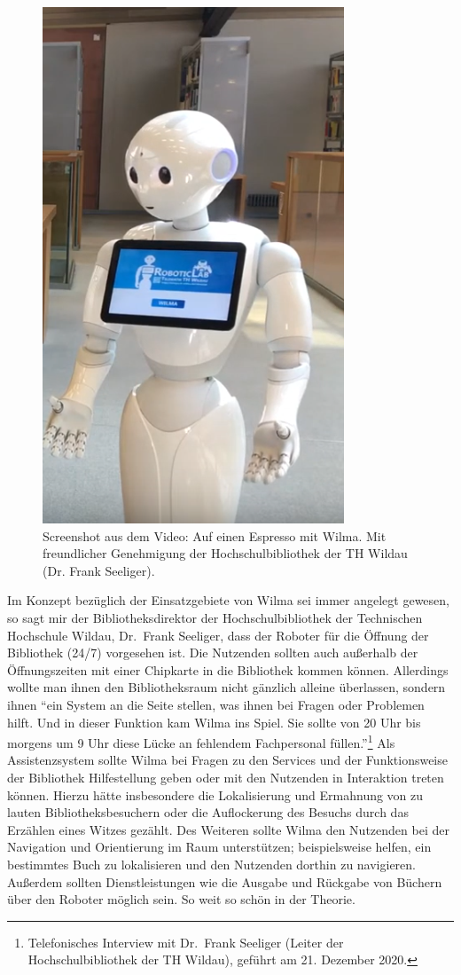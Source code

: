 \documentclass[a4paper,
fontsize=11pt,
oneside,
numbers=noperiodatend,
parskip=half-,
bibliography=totoc,
final
]{scrartcl}
\begin{document}
\begin{figure}
\centering
\includegraphics{img/Wilma.PNG}
\caption{Screenshot aus dem Video: Auf einen Espresso mit Wilma. Mit freundlicher Genehmigung der Hochschulbibliothek der TH Wildau (Dr. Frank Seeliger).}
\end{figure}

Im Konzept bezüglich der Einsatzgebiete von Wilma sei immer angelegt
gewesen, so sagt mir der Bibliotheksdirektor der Hochschulbibliothek der
Technischen Hochschule Wildau, Dr.~Frank Seeliger, dass der Roboter für
die Öffnung der Bibliothek (24/7) vorgesehen ist. Die Nutzenden sollten
auch außerhalb der Öffnungszeiten mit einer Chipkarte in die Bibliothek
kommen können. Allerdings wollte man ihnen den Bibliotheksraum nicht
gänzlich alleine überlassen, sondern ihnen \enquote{ein System an die
Seite stellen, was ihnen bei Fragen oder Problemen hilft. Und in dieser
Funktion kam Wilma ins Spiel. Sie sollte von 20 Uhr bis morgens um 9 Uhr
diese Lücke an fehlendem Fachpersonal füllen.}\footnote{Telefonisches
  Interview mit Dr.~Frank Seeliger (Leiter der Hochschulbibliothek der
  TH Wildau), geführt am 21. Dezember 2020.} Als Assistenzsystem sollte
Wilma bei Fragen zu den Services und der Funktionsweise der Bibliothek
Hilfestellung geben oder mit den Nutzenden in Interaktion treten können.
Hierzu hätte insbesondere die Lokalisierung und Ermahnung von zu lauten
Bibliotheksbesuchern oder die Auflockerung des Besuchs durch das
Erzählen eines Witzes gezählt. Des Weiteren sollte Wilma den Nutzenden
bei der Navigation und Orientierung im Raum unterstützen; beispielsweise
helfen, ein bestimmtes Buch zu lokalisieren und den Nutzenden dorthin zu
navigieren. Außerdem sollten Dienstleistungen wie die Ausgabe und
Rückgabe von Büchern über den Roboter möglich sein. So weit so schön in
der Theorie.
\end{document}
